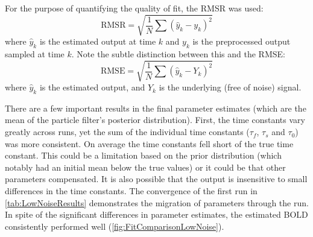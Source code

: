For the purpose of quantifying the quality of fit, the 
\ac{RMSR} was used:
\begin{equation}
\text{RMSR} = \sqrt{\frac{1}{N}\sum (\hat{y}_k - y_k)^2}
\end{equation}
where $\hat{y}_k$ is the estimated output at time $k$ and $y_k$ is the 
preprocessed output
sampled at time $k$. Note the subtle distinction between this and
the \ac{RMSE}:
\begin{equation}
\text{RMSE} = \sqrt{\frac{1}{N}\sum (\hat{y}_k - Y_k)^2}
\end{equation}
where $\hat{y}_k$ is the estimated output, and $Y_k$ is the underlying 
(free of noise) signal. 

There are a few important results in the final parameter estimates (which
are the mean of the particle filter's posterior distribution). First, the time constants vary
greatly across
runs, yet the sum of the individual time constants
($\tau_f$, $\tau_s$ and $\tau_0$) was more consistent. On average the
time constants fell short of the true time constant. This could be a limitation
based on the prior distribution (which notably had an initial mean below the true values)
or it could be that other parameters compensated. It is also possible that the output is insensitive
to small differences in the time constants.
The convergence of the first run in \autoref{tab:LowNoiseResults}
demonstrates the migration of parameters through the run. In spite of the
significant differences in parameter estimates, the estimated \ac{BOLD}
consistently performed well
(\autoref{fig:FitComparisonLowNoise}).


